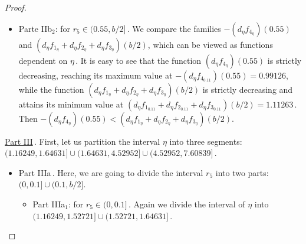 \documentclass[final,11pt]{article}
\numberwithin{equation}{section}
\theoremstyle{definition}
\begin{document}
\begin{proof}
\begin{itemize}
\begin{itemize}
\begin{itemize}
\item For $\eta\in(0.557561,1.16249]$\,. We consider the line $L_{27}(\eta)$, which connects the ends of the curve given by the function $\left(d_{\eta}f_{1_{\eta}}+d_{\eta}f_{2_{\eta} }+d_{\eta}f_{3_{\eta}}\right)(0.55)$\,. It is easy to see that such line is monotonically increasing, therefore, the minimum value is $L_{27}(0.557561)=1.55486$\,. On the other hand, the maximum value of $-\left(d_{\eta}f_{4_{\eta}}\right)(0.45)$ is $-\left(d_{\eta}f_{4_{0.557561} }\right)(0.45)=0.966289$\,. Then, $\left(d_{\eta}f_{1_{\eta}}+d_{\eta}f_{2_{\eta} }+d_{\eta}f_{3_{\eta}}\right) (0.55)>-\left(d_{\eta}f_{4_{\eta}}\right)(0.45)$.
\end{itemize}
\item Parte IIb$_{2}$: for $r_{5}\in(0.55,b/2]$\,. We compare the families $-\left(d_{\eta}f_{4_{\eta}}\right)(0.55)$ and $\left(d_{\eta}f_{1_{\eta}}+d_{\eta}f_{2_{\eta} }+d_{\eta}f_{3_{\eta}}\right)(b/2)$, which can be viewed as functions dependent on $\eta$\,. It is easy to see that the function $\left(d_{\eta}f_{4_{\eta}}\right)(0.55)$ is strictly decreasing, reaching its maximum value at $-\left(d_{\eta}f_{4_{0.11}}\right)(0.55)=0.99126$, while the function $\left(d_{\eta}f_{1_{\eta}}+d_{\eta}f_{2_{\eta} }+d_{\eta}f_{3_{\eta}}\right)(b/2)$ is strictly decreasing and attains its minimum value at $\left(d_{\eta}f_{1_{0.11}}+d_{\eta}f_{2_{0.11}}+d_{\eta}f_{3_{0.11}}\right)(b/2)=1.11263$\,. Then $-\left(d_{\eta}f_{4_{\eta}}\right)(0.55)<\left(d_{\eta}f_{1_{\eta}}+d_{\eta}f_{2_{\eta} }+d_{\eta}f_{3_{\eta}}\right)(b/2)$.
\end{itemize}
\end{itemize}
\underline{Part III}\,. First, let us partition the interval $\eta$ into three segments: $(1.16249,1.64631]\cup(1.64631,4.52952]\cup(4.52952,7.60839]$\,. 
\begin{itemize}
\item Part IIIa\,. Here, we are going to divide the interval $r_{5}$ into two parts: $(0,0.1]\cup(0.1,b/2]$.
\begin{itemize}
\item Part IIIa$_{1}$: for $r_{5}\in(0,0.1]$\,. Again we divide the interval of $\eta$ into $(1.16249,1.52721]\cup(1.52721,1.64631]$\,. 
\begin{itemize}

\end{itemize}
\end{itemize}
\end{itemize}
\end{proof}
\end{document}
